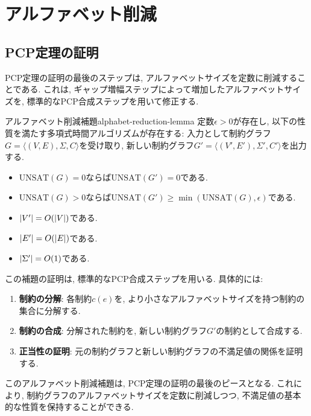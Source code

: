 \chapter{アルファベット削減} \label{chap:alphabet-reduction}

\section{PCP定理の証明}

PCP定理の証明の最後のステップは, アルファベットサイズを定数に削減することである. これは, ギャップ増幅ステップによって増加したアルファベットサイズを, 標準的なPCP合成ステップを用いて修正する.

\begin{lemma}{アルファベット削減補題}{alphabet-reduction-lemma}
  定数$\epsilon > 0$が存在し, 以下の性質を満たす多項式時間アルゴリズムが存在する:
  入力として制約グラフ$G = \langle(V, E), \Sigma, C\rangle$を受け取り, 新しい制約グラフ$G' = \langle(V', E'), \Sigma', C'\rangle$を出力する.
  \begin{itemize}
  \item $\mathrm{UNSAT}(G) = 0$ならば$\mathrm{UNSAT}(G') = 0$である.
  \item $\mathrm{UNSAT}(G) > 0$ならば$\mathrm{UNSAT}(G') \ge \min(\mathrm{UNSAT}(G), \epsilon)$である.
  \item $\abs{V'} = O(\abs{V})$である.
  \item $\abs{E'} = O(\abs{E})$である.
  \item $\abs{\Sigma'} = O(1)$である.
  \end{itemize}
\end{lemma}

この補題の証明は, 標準的なPCP合成ステップを用いる. 具体的には:

\begin{enumerate}
\item \textbf{制約の分解}: 各制約$c(e)$を, より小さなアルファベットサイズを持つ制約の集合に分解する.

\item \textbf{制約の合成}: 分解された制約を, 新しい制約グラフ$G'$の制約として合成する.

\item \textbf{正当性の証明}: 元の制約グラフと新しい制約グラフの不満足値の関係を証明する.
\end{enumerate}

このアルファベット削減補題は, PCP定理の証明の最後のピースとなる. これにより, 制約グラフのアルファベットサイズを定数に削減しつつ, 不満足値の基本的な性質を保持することができる.

